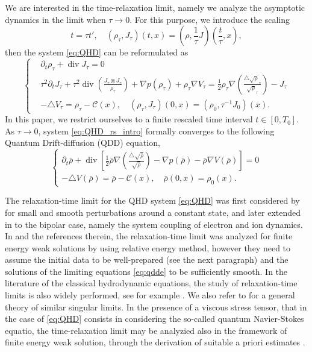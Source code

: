 \documentclass[english]{amsart}
\theoremstyle{plain}
\theoremstyle{definition}
\theoremstyle{remark}
\theoremstyle{plain}
\theoremstyle{plain}
\theoremstyle{plain}
\def\d{{\partial}}
\DeclareMathOperator{\diver}{div}
\numberwithin{equation}{section}
\begin{document}
We are interested in the time-relaxation limit, namely we analyze the asymptotic dynamics in the limit when $\tau\to0$. For this purpose, we introduce the scaling
\begin{equation}\label{eq:rs_intro}
t=\tau t',\quad (\rho_\tau,J_\tau)(t,x)=\left(\rho,\frac{1}{\tau}J\right)\left(\frac{t}{\tau},x\right),
\end{equation}
then the system \eqref{eq:QHD} can be reformulated as
\begin{equation}\label{eq:QHD_rs_intro}
\left\{\begin{aligned}
&\d_{t}\rho_\tau+\diver J_\tau=0\\
&\tau^2\d_{t} J_\tau+\tau^2\diver\left(\frac{J_\tau\otimes J_\tau}{\rho_\tau}\right)+\nabla p(\rho_\tau)+\rho_\tau\nabla V_\tau=\frac{1}{2}\rho_\tau\nabla\left(\frac{\triangle\sqrt\rho_\tau}{\sqrt\rho_\tau}\right)-J_\tau\\
&-\triangle V_\tau=\rho_\tau-\mathcal{C}(x),\quad (\rho_\tau,J_\tau)(0,x)=(\rho_0,\tau^{-1}J_0)(x).
\end{aligned}\right.
\end{equation}
In this paper, we restrict ourselves to a finite rescaled time interval $t\in [0,T_0]$.
As $\tau\to 0$, system \eqref{eq:QHD_rs_intro} formally converges to the following Quantum Drift-diffusion (QDD) equation, 
\begin{equation}\label{eq:qdde}
\begin{cases}
\d_{t}\bar\rho+\diver\left[\frac{1}{2}\bar\rho\nabla\left(\frac{\triangle\sqrt{\bar\rho}}{\sqrt{\bar\rho}}\right)-\nabla p(\bar\rho)-\bar\rho\nabla V(\bar\rho)\right]=0\\
-\triangle V(\bar\rho)=\bar\rho-\mathcal{C}(x),\quad \bar\rho(0,x)=\rho_0(x).
\end{cases}
\end{equation}

The relaxation-time limit for the QHD system \eqref{eq:QHD} was first considered by \cite{JLM} for small and smooth perturbations around a constant state, and later extended in \cite{LZZ} to the bipolar case, namely the system coupling of electron and ion dynamics. In \cite{LT} and the references therein, the relaxation-time limit was analyzed for finite energy weak solutions by using relative energy method, however they need to assume the initial data to be well-prepared (see the next paragraph) and the solutions of the limiting equations \eqref{eq:qdde} to be sufficiently smooth. In the literature of the classical hydrodynamic equations, the study of relaxation-time limits is also widely performed, see for example \cite{HL,HP,JP, MN}. We also refer to \cite{DM} for a general theory of similar singular limits. In the presence of a viscous stress tensor, that in the case of \eqref{eq:QHD} consists in considering the so-called quantum Navier-Stokes equatio, the time-relaxation limit may be analyzied also in the framework of finite energy weak solution, through the derivation of suitable a priori estimates \cite{ACLS, Blub}.
\end{document}
